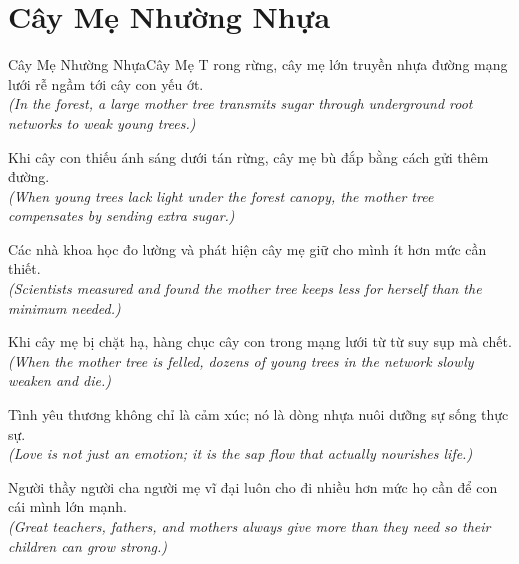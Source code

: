 \section{Cây Mẹ Nhường Nhựa}
\begin{truyen}{Cây Mẹ Nhường Nhựa}{Cây Mẹ}
T rong rừng, cây mẹ lớn truyền nhựa đường mạng lưới rễ ngầm tới cây con yếu ớt.\\
\textit{(In the forest, a large mother tree transmits sugar through underground root networks to weak young trees.)}

Khi cây con thiếu ánh sáng dưới tán rừng, cây mẹ bù đắp bằng cách gửi thêm đường.\\
\textit{(When young trees lack light under the forest canopy, the mother tree compensates by sending extra sugar.)}

Các nhà khoa học đo lường và phát hiện cây mẹ giữ cho mình ít hơn mức cần thiết.\\
\textit{(Scientists measured and found the mother tree keeps less for herself than the minimum needed.)}

Khi cây mẹ bị chặt hạ, hàng chục cây con trong mạng lưới từ từ suy sụp mà chết.\\
\textit{(When the mother tree is felled, dozens of young trees in the network slowly weaken and die.)}

Tình yêu thương không chỉ là cảm xúc; nó là dòng nhựa nuôi dưỡng sự sống thực sự.\\
\textit{(Love is not just an emotion; it is the sap flow that actually nourishes life.)}

\end{truyen}
\begin{baihoc}
  Người thầy người cha người mẹ vĩ đại luôn cho đi nhiều hơn mức họ cần để con cái mình lớn mạnh.\\
  \textit{(Great teachers, fathers, and mothers always give more than they need so their children can grow strong.)}
\end{baihoc}

